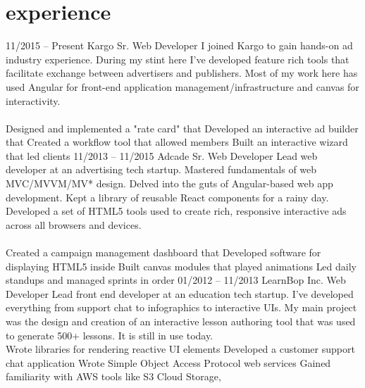 \documentclass[]{friggeri-cv}
\begin{document}
\section{experience}
\tabentry
  {11/2015 – Present}
  {Kargo}
  {Sr. Web Developer}
  {I joined Kargo to gain hands-on ad industry experience. During my stint here I've developed feature rich tools that facilitate exchange between advertisers and publishers. Most of my work here has used Angular for front-end application management/infrastructure and canvas for interactivity.\\%
  \\%
    \bulletlist
    {Designed and implemented a "rate card" that }
    {Developed an interactive ad builder that }
    {Created a workflow tool that allowed members }
    {Built an interactive wizard that led clients }
  }
\tabentry
  {11/2013 – 11/2015}
  {Adcade}
  {Sr. Web Developer}
  {Lead web developer at an advertising tech startup. Mastered fundamentals of web MVC/MVVM/MV* design. Delved into the guts of Angular-based web app development. Kept a library of reusable React components for a rainy day. Developed a set of HTML5 tools used to create rich, responsive interactive ads across all browsers and devices.\\%
  \\%
    \bulletlist
    {Created a campaign management dashboard that }
    {Developed software for displaying HTML5 inside }
    {Built canvas modules that played animations }
    {Led daily standups and managed sprints in order }
  }
\tabentry
  {01/2012 – 11/2013}
  {LearnBop Inc.}
  {Web Developer}
  {Lead front end developer at an education tech startup. I've developed everything from support chat to infographics to interactive UIs. My main project was the design and creation of an interactive lesson authoring tool that was used to generate 500+ lessons. It is still in use today.
  \\%
    \bulletlist
    {Wrote libraries for rendering reactive UI elements }
    {Developed a customer support chat application }
    {Wrote Simple Object Access Protocol web services }
    {Gained familiarity with AWS tools like S3 Cloud Storage, }
  }
\end{document}
